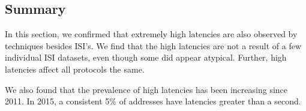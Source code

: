 





\subsection{Summary}

In this section, we confirmed that extremely high latencies are also observed by
techniques besides ISI's. We find that the high latencies are
not a result of a few individual ISI datasets, even though some
did appear atypical.  Further, high latencies affect all
protocols the same. 

We also found that the prevalence of high latencies has been increasing
since 2011. In 2015, a consistent 5\% of addresses have
latencies greater than a second. 
